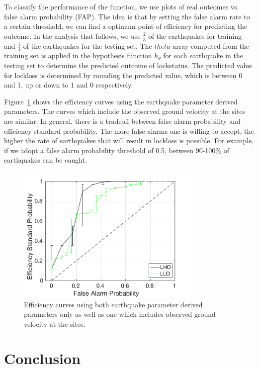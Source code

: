 \documentclass[reprint, prl, aps, showpacs]{revtex4-1}
\begin{document}
			
To classify the performance of the function, we use plots of real outcomes vs. false alarm probability (FAP). The idea is that by setting the false alarm rate to a certain threshold, we can find a optimum point of efficiency for predicting the outcome.
In the analysis that follows, we use $\frac{2}{3}$ of the earthquakes for training and  $\frac{1}{3}$ of the earthquakes for the testing set. The $theta$ array computed from the training set is applied in the hypothesis function $h_{\theta}$ for each earthquake in the testing set to determine the predicted outcome of lockstatus. The predicted value for lockloss is determined by rounding the predicted value, which is between 0 and 1, up or down to 1 and 0 respectively.

Figure~\ref{fig:MLA} shows the efficiency curves using the earthquake parameter derived parameters. 
The curves which include the observed ground velocity at the sites are similar. 
In general, there is a tradeoff between false alarm probability and efficiency standard probability.
The more false alarms one is willing to accept, the higher the rate of earthquakes that will result in lockloss is possible.
For example, if we adopt a false alarm probability threshold of 0.5, between 90-100\% of earthquakes can be caught.
	
\begin{figure}[h]
 \includegraphics[width=3.5in]{lockloss_fap_errorbars.pdf}
 \centering
 \caption{Efficiency curves using both earthquake parameter derived parameters only as well as one which includes observed ground velocity at the sites.}
 \label{fig:MLA}
\end{figure}
	
	


\section{Conclusion}
\label{sec:conclusions}
\end{document}
